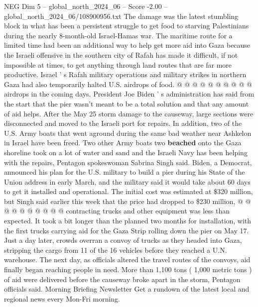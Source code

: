 \begin{textsample}{NEG Dim 5 – global\_north\_2024\_06 – Score -2.00 – global\_north\_2024\_06/108900956.txt}
The damage was the latest stumbling block in what has been a persistent struggle to get food to starving Palestinians during the nearly 8-month-old Israel-Hamas war.
The maritime route for a limited time had been an additional way to help get more aid into Gaza because the Israeli offensive in the southern city of Rafah has made it difficult, if not impossible at times, to get anything through land routes that are far more productive.
Israel ' s Rafah military operations and military strikes in northern Gaza had also temporarily halted U.S. airdrops of food. @ @ @ @ @ @ @ @ @ @ airdrops in the coming days.
President Joe Biden ' s administration has said from the start that the pier wasn't meant to be a total solution and that any amount of aid helps.
After the May 25 storm damage to the causeway, large sections were disconnected and moved to the Israeli port for repairs.
In addition, two of the U.S.
Army boats that went aground during the same bad weather near Ashkelon in Israel have been freed.
Two other Army boats two \textbf{beached} onto the Gaza shoreline took on a lot of water and sand and the Israeli Navy has been helping with the repairs, Pentagon spokeswoman Sabrina Singh said.
Biden, a Democrat, announced his plan for the U.S. military to build a pier during his State of the Union address in early March, and the military said it would take about 60 days to get it installed and operational.
The initial cost was estimated at \$320 million, but Singh said earlier this week that the price had dropped to \$230 million, @ @ @ @ @ @ @ @ @ @ contracting trucks and other equipment was less than expected.
It took a bit longer than the planned two months for installation, with the first trucks carrying aid for the Gaza Strip rolling down the pier on May 17.
Just a day later, crowds overran a convoy of trucks as they headed into Gaza, stripping the cargo from 11 of the 16 vehicles before they reached a U.N. warehouse.
The next day, as officials altered the travel routes of the convoys, aid finally began reaching people in need.
More than 1,100 tons ( 1,000 metric tons ) of aid were delivered before the causeway broke apart in the storm, Pentagon officials said.
Morning Briefing Newsletter Get a rundown of the latest local and regional news every Mon-Fri morning.

\end{textsample}

